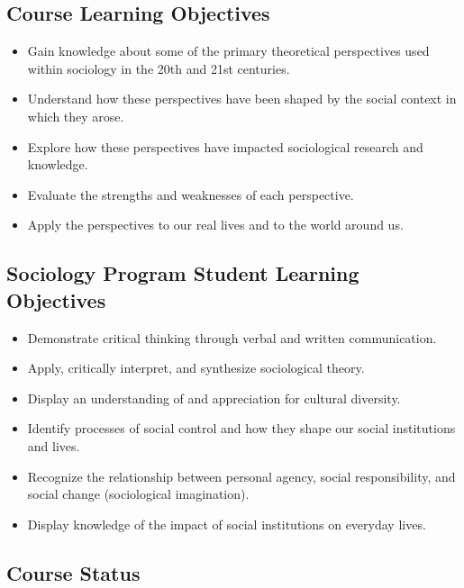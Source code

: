 \documentclass[11pt,]{article}
\providecommand{\tightlist}{%
  \setlength{\itemsep}{0pt}\setlength{\parskip}{0pt}}
\begin{document}
\hypertarget{course-learning-objectives}{%
\subsection{Course Learning
Objectives}\label{course-learning-objectives}}

\begin{itemize}
\tightlist
\item
  Gain knowledge about some of the primary theoretical perspectives used
  within sociology in the 20th and 21st centuries.
\item
  Understand how these perspectives have been shaped by the social
  context in which they arose.
\item
  Explore how these perspectives have impacted sociological research and
  knowledge.
\item
  Evaluate the strengths and weaknesses of each perspective.
\item
  Apply the perspectives to our real lives and to the world around us.
\end{itemize}

\hypertarget{sociology-program-student-learning-objectives}{%
\subsection{Sociology Program Student Learning
Objectives}\label{sociology-program-student-learning-objectives}}

\begin{itemize}
\tightlist
\item
  Demonstrate critical thinking through verbal and written
  communication.
\item
  Apply, critically interpret, and synthesize sociological theory.
\item
  Display an understanding of and appreciation for cultural diversity.
\item
  Identify processes of social control and how they shape our social
  institutions and lives.
\item
  Recognize the relationship between personal agency, social
  responsibility, and social change (sociological imagination).
\item
  Display knowledge of the impact of social institutions on everyday
  lives.
\end{itemize}

\hypertarget{course-status}{%
\subsection{Course Status}\label{course-status}}
\end{document}

